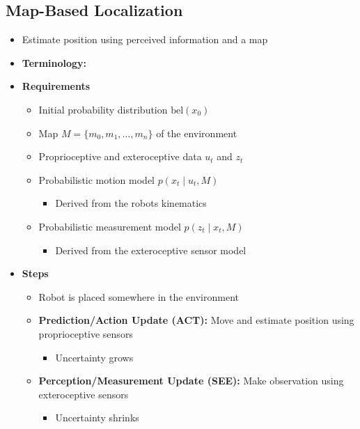 \documentclass[a4paper]{article}
\newcommand{\ides}[1]{\item \textbf{#1}}
\begin{document}
\subsection{Map-Based Localization}
\begin{itemize}
    \item Estimate position using perceived information and a map
    \ides{Terminology:}
    \ides{Requirements}
        \begin{itemize}
            \item Initial probability distribution $\text{bel}(x_0)$
            \item Map $M = \{m_0, m_1, \dots, m_n\}$ of the environment
            \item Proprioceptive and exteroceptive data $u_t$ and $z_t$
            \item Probabilistic motion model $p(x_t \mid u_t, M)$
                \begin{itemize}
                    \item Derived from the robots kinematics
                \end{itemize}
            \item Probabilistic measurement model $p(z_t \mid x_t, M)$
                \begin{itemize}
                    \item Derived from the exteroceptive sensor model
                \end{itemize}
        \end{itemize}
    \ides{Steps}
        \begin{itemize}
            \item[0)] Robot is placed somewhere in the environment
            \item[S1)] \textbf{Prediction/Action Update (ACT):} Move and estimate position using proprioceptive sensors
                \begin{itemize}
                    \item Uncertainty grows
                \end{itemize}
            \item[S2)] \textbf{Perception/Measurement Update (SEE):} Make observation using exteroceptive sensors
                \begin{itemize}
                    \item Uncertainty shrinks
                \end{itemize}
        \end{itemize}
\end{itemize}
\end{document}
